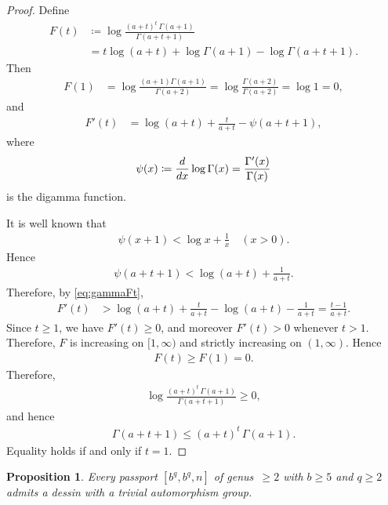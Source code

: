 \documentclass[12pt,reqno]{amsart}
\newcommand{\q}{\quad}									%
\newcommand{\ceq}{\coloneqq} 							%
\theoremstyle{mythmstyle}
\newtheorem{prop}[lemma]{Proposition}
\theoremstyle{mydefstyle}
\numberwithin{equation}{section}
\begin{document}
\begin{proof}
Define
\begin{align}
F(t)
&\ceq \log \frac{(a+t)^{t}\,\Gamma(a+1)}{\Gamma(a+t+1)} \\
&= t\log(a+t) + \log \Gamma(a+1) - \log \Gamma(a+t+1).
\end{align}
Then
\begin{align}
F(1)
&= \log \frac{(a+1)\Gamma(a+1)}{\Gamma(a+2)}
= \log \frac{\Gamma(a+2)}{\Gamma(a+2)}
= \log 1
= 0,
\end{align}
and
\begin{align}
\label{eq:gammaFt}
F'(t)
&= \log(a+t) + \frac{t}{a+t} - \psi(a+t+1),
\end{align}
where
\begin{align}
\psi(x)
\ceq \dv{x}\log \Gamma(x)
= \frac{\Gamma'(x)}{\Gamma(x)}
\end{align}
is the digamma function.

It is well known that
\begin{align}
\psi(x+1) < \log x + \frac{1}{x} \q (x>0).
\end{align}
Hence
\begin{align}
\psi(a+t+1) < \log(a+t) + \frac{1}{a+t}.
\end{align}
Therefore, by \eqref{eq:gammaFt},
\begin{align}
F'(t) &> \log(a+t) + \frac{t}{a+t} - \log(a+t) - \frac{1}{a+t} = \frac{t-1}{a+t}.
\end{align}
Since $t \ge 1$, we have $F'(t) \ge 0$, and moreover $F'(t) > 0$ whenever $t>1$.
Therefore, $F$ is increasing on $[1,\infty)$ and strictly increasing on $(1,\infty)$.
Hence
\begin{align}
F(t) \ge F(1) = 0.
\end{align}
Therefore,
\begin{align}
\log \frac{(a+t)^{t}\,\Gamma(a+1)}{\Gamma(a+t+1)} \ge 0,
\end{align}
and hence
\begin{align}
\Gamma(a+t+1) \le (a+t)^{t}\,\Gamma(a+1).
\end{align}
Equality holds if and only if $t=1$.
\end{proof}

\begin{prop}
\label{prop:class3bge5}
Every passport $[b^{q}, b^{q}, n]$ of genus~$\ge 2$ with $b \ge 5$ and $q \ge 2$ admits a dessin with a trivial automorphism group.
\end{prop}
\end{document}
